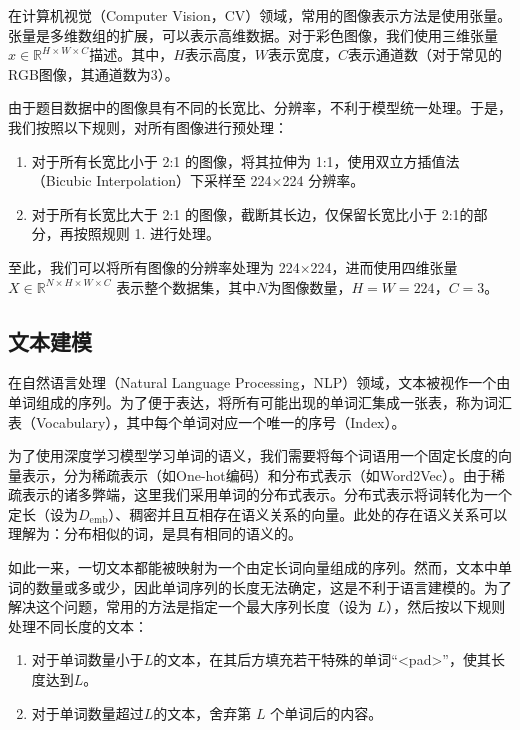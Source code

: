 \documentclass[a4paper]{zreport}
\begin{document}
在计算机视觉（Computer Vision，CV）领域，常用的图像表示方法是使用张量。张量是多维数组的扩展，可以表示高维数据。对于彩色图像，我们使用三维张量$x \in \mathbb{R}^{H \times W \times C}$描述。其中，$H$表示高度，$W$表示宽度，$C$表示通道数（对于常见的RGB图像，其通道数为3）。

由于题目数据中的图像具有不同的长宽比、分辨率，不利于模型统一处理。于是，我们按照以下规则，对所有图像进行预处理：

\begin{enumerate}
\item 对于所有长宽比小于 2:1 的图像，将其拉伸为 1:1，使用双立方插值法（Bicubic Interpolation）下采样至 224$\times$224 分辨率。
\item 对于所有长宽比大于 2:1 的图像，截断其长边，仅保留长宽比小于 2:1的部分，再按照规则 1. 进行处理。
\end{enumerate}

至此，我们可以将所有图像的分辨率处理为 224$\times$224，进而使用四维张量 $X \in \mathbb{R}^{N \times H \times W \times C}$ 表示整个数据集，其中$N$为图像数量，$H=W=224$，$C=3$。

\subsection{文本建模}

在自然语言处理（Natural Language Processing，NLP）领域，文本被视作一个由单词组成的序列。为了便于表达，将所有可能出现的单词汇集成一张表，称为词汇表（Vocabulary），其中每个单词对应一个唯一的序号（Index）。

为了使用深度学习模型学习单词的语义，我们需要将每个词语用一个固定长度的向量表示，分为稀疏表示（如One-hot编码）和分布式表示（如Word2Vec）。由于稀疏表示的诸多弊端，这里我们采用单词的分布式表示。分布式表示将词转化为一个定长（设为$D_\mathrm{emb}$）、稠密并且互相存在语义关系的向量。此处的存在语义关系可以理解为：分布相似的词，是具有相同的语义的。

如此一来，一切文本都能被映射为一个由定长词向量组成的序列。然而，文本中单词的数量或多或少，因此单词序列的长度无法确定，这是不利于语言建模的。为了解决这个问题，常用的方法是指定一个最大序列长度（设为 $L$），然后按以下规则处理不同长度的文本：

\begin{enumerate}
\item 对于单词数量小于$L$的文本，在其后方填充若干特殊的单词“<pad>”，使其长度达到$L$。
\item 对于单词数量超过$L$的文本，舍弃第 $L$ 个单词后的内容。
\end{enumerate}
\end{document}
